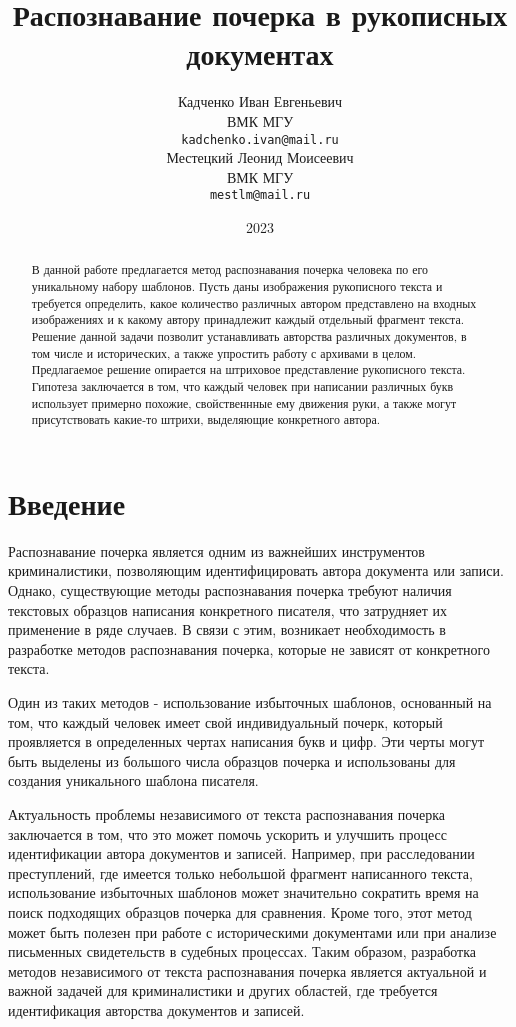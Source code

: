 \documentclass{article}
\title{Распознавание почерка в рукописных документах}
\author{Кадченко Иван Евгеньевич \\
	ВМК МГУ\\
	\texttt{kadchenko.ivan@mail.ru} \\
	\And
	Местецкий Леонид Моисеевич \\
	ВМК МГУ\\
	\texttt{mestlm@mail.ru} \\
}
\date{2023}
\begin{document}
\maketitle

\begin{abstract}
	В данной работе предлагается метод распознавания почерка человека по его уникальному набору шаблонов. Пусть даны изображения рукописного текста и требуется определить, какое количество различных автором представлено на входных изображениях и к какому автору принадлежит каждый отдельный фрагмент текста. Решение данной задачи позволит устанавливать авторства различных документов, в том числе и исторических, а также упростить работу с архивами в целом. Предлагаемое решение опирается на штриховое представление рукописного текста. Гипотеза заключается в том, что каждый человек при написании различных букв использует примерно похожие, свойственнные ему движения руки, а также могут присутствовать какие-то штрихи, выделяющие конкретного автора.
\end{abstract}



\section{Введение}
Распознавание почерка является одним из важнейших инструментов криминалистики, позволяющим идентифицировать автора документа или записи. Однако, существующие методы распознавания почерка требуют наличия текстовых образцов написания конкретного писателя, что затрудняет их применение в ряде случаев. В связи с этим, возникает необходимость в разработке методов распознавания почерка, которые не зависят от конкретного текста.

Один из таких методов - использование избыточных шаблонов, основанный на том, что каждый человек имеет свой индивидуальный почерк, который проявляется в определенных чертах написания букв и цифр. Эти черты могут быть выделены из большого числа образцов почерка и использованы для создания уникального шаблона писателя.

Актуальность проблемы независимого от текста распознавания почерка заключается в том, что это может помочь ускорить и улучшить процесс идентификации автора документов и записей. Например, при расследовании преступлений, где имеется только небольшой фрагмент написанного текста, использование избыточных шаблонов может значительно сократить время на поиск подходящих образцов почерка для сравнения. Кроме того, этот метод может быть полезен при работе с историческими документами или при анализе письменных свидетельств в судебных процессах. Таким образом, разработка методов независимого от текста распознавания почерка является актуальной и важной задачей для криминалистики и других областей, где требуется идентификация авторства документов и записей.
\end{document}
